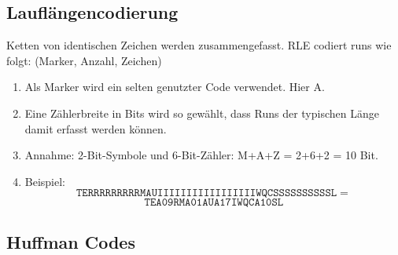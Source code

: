 \subsection{Lauflängencodierung}
Ketten von identischen Zeichen werden zusammengefasst. RLE codiert runs wie folgt: (Marker, Anzahl, Zeichen)
\begin{enumerate}
    \item Als Marker wird ein selten genutzter Code verwendet. Hier A.
    \item Eine Zählerbreite in Bits wird so gewählt, dass Runs der typischen Länge damit erfasst werden können.
    \item Annahme: 2-Bit-Symbole und 6-Bit-Zähler: M+A+Z = 2+6+2 = 10 Bit.
    \item Beispiel:
    \[\mathtt{TERRRRRRRRRMAUIIIIIIIIIIIIIIIIIWQCSSSSSSSSSSL}=\]
    \[\mathtt{TEA09RMA01AUA17IWQCA10SL}\]
\end{enumerate}

\subsection{Huffman Codes}
